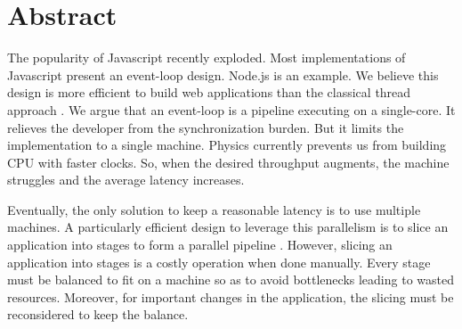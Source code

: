 \section*{Abstract}








The popularity of Javascript recently exploded.
Most implementations of Javascript present an event-loop design.
Node.js is an example.
We believe this design is more efficient to build web applications than the classical thread approach \cite{Lei2014}.
We argue that an event-loop is a pipeline executing on a single-core.
It relieves the developer from the synchronization burden.
But it limits the implementation to a single machine.
Physics currently prevents us from building CPU with faster clocks.
So, when the desired throughput augments, the machine struggles and the average latency increases.

Eventually, the only solution to keep a reasonable latency is to use multiple machines.
A particularly efficient design to leverage this parallelism is to slice an application into stages to form a parallel pipeline \cite{Welsh2000}.
However, slicing an application into stages is a costly operation when done manually.
Every stage must be balanced to fit on a machine so as to avoid bottlenecks leading to wasted resources.
Moreover, for important changes in the application, the slicing must be reconsidered to keep the balance.

